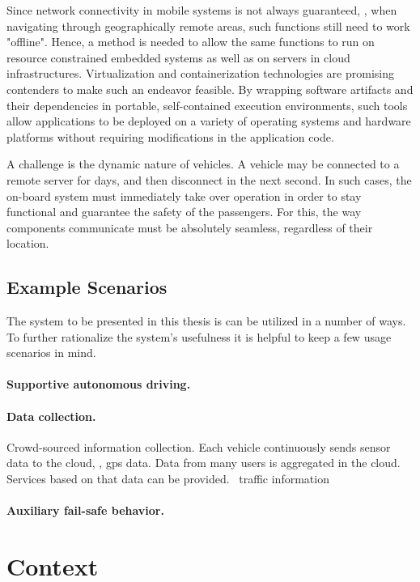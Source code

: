Since network connectivity in mobile systems is not always guaranteed, \eg , when navigating through geographically remote areas, such functions still need to work "offline". Hence, a method is needed to allow the same functions to run on resource constrained embedded systems as well as on servers in cloud infrastructures. Virtualization and containerization technologies are promising contenders to make such an endeavor feasible. By wrapping software artifacts and their dependencies in portable, self-contained execution environments, such tools allow applications to be deployed on a variety of operating systems and hardware platforms without requiring modifications in the application code. 

A challenge is the dynamic nature of vehicles. A vehicle may be connected to a remote server for days, and then disconnect in the next second. In such cases, the on-board system must immediately take over operation in order to stay functional and guarantee the safety of the passengers. For this, the way components communicate must be absolutely seamless, regardless of their location.


\subsection{Example Scenarios}
The system to be presented in this thesis is can be utilized in a number of ways. To further rationalize the system's usefulness it is helpful to keep a few usage scenarios in mind.

\paragraph{Supportive autonomous driving.}


\paragraph{Data collection.} Crowd-sourced information collection. Each vehicle continuously sends sensor data to the cloud, \eg , gps data. Data from many users is aggregated in the cloud. Services based on that data can be provided. \Eg\ traffic information


\paragraph{Auxiliary fail-safe behavior.}

%
%
%
%
%
%
%
%
%
%

\section{Context}

